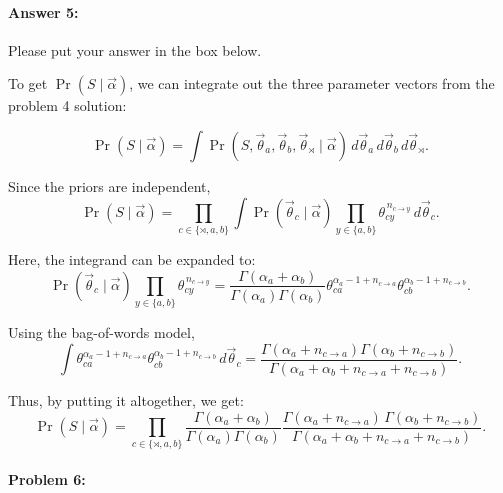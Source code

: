 \documentclass[10pt]{article}
\newenvironment{AnswerBox}{\begin{mdframed}[style=simple]}{\end{mdframed}}
\begin{document}
\paragraph{Answer 5:} Please put your answer in the box below.


\begin{AnswerBox}%

    To get $\Pr(S \mid \vec\alpha)$, we can integrate out the three parameter vectors from the problem 4 solution:
    
    \[
    \Pr(S \mid \vec\alpha)
    = \int \Pr (S,\vec\theta_a,\vec\theta_b,\vec\theta_{\rtimes}\mid\vec\alpha) \,
       d\vec\theta_a\,d\vec\theta_b\,d\vec\theta_{\rtimes}.
    \]
    
    Since the priors are independent,
    \[ \Pr(S \mid \vec\alpha)
    = \prod_{c\in\{\rtimes,a,b\}}
       \int \Pr(\vec\theta_c \mid \vec\alpha)
            \prod_{y\in\{a,b\}}
            \theta_{cy}^{\,n_{c\to y}}\, d\vec\theta_c .
    \]
    
    Here, the integrand can be expanded to:    
    \[
    \Pr(\vec\theta_c\mid\vec\alpha)
    \prod_{y\in\{a,b\}}
    \theta_{cy}^{\,n_{c\to y}}
    =
    \frac{\Gamma(\alpha_a+\alpha_b)} {\Gamma(\alpha_a)\Gamma(\alpha_b)}
    \theta_{ca}^{\alpha_a-1+n_{c\to a}} \theta_{cb}^{\alpha_b-1+n_{c\to b}}.
    \]

    Using the bag-of-words model, 
    \[
    \int
    \theta_{ca}^{\alpha_a-1+n_{c\to a}} \theta_{cb}^{\alpha_b-1+n_{c\to b}} \, d\vec\theta_c
    =
    \frac{\Gamma(\alpha_a+n_{c\to a}) \Gamma(\alpha_b+n_{c\to b})} {\Gamma(\alpha_a+\alpha_b+n_{c\to a}+n_{c\to b})}.
    \]
    
    Thus, by putting it altogether, we get:
    \[
    \Pr(S\mid\vec\alpha)
    =
    \prod_{c\in\{\rtimes,a,b\}}
    \frac{\Gamma(\alpha_a+\alpha_b)} {\Gamma(\alpha_a)\Gamma(\alpha_b)}
    \frac{\Gamma(\alpha_a+n_{c\to a})\, \Gamma(\alpha_b+n_{c\to b})} {\Gamma(\alpha_a+\alpha_b+n_{c\to a}+n_{c\to b})}.
    \]
    
    
\end{AnswerBox}%


\hrulefill %

\paragraph{Problem 6:}
\end{document}
